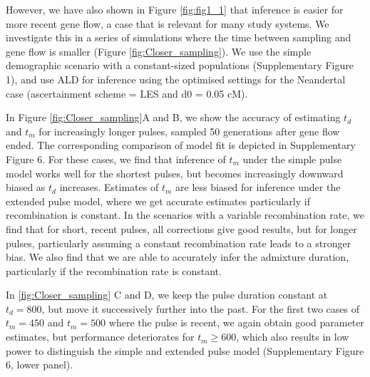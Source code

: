 \documentclass[11pt]{article}
\begin{document}
However, we have also shown in Figure  \ref{fig:fig1_1} that inference is easier for more recent gene flow, a case that is relevant for many study systems. We investigate this in a series of simulations where the time between sampling and gene flow is smaller (Figure \ref{fig:Closer_sampling}). We use the simple demographic scenario with a constant-sized populations (Supplementary Figure 1), and use ALD for inference using the optimised settings for the Neandertal case (ascertainment scheme = LES and  d0 = 0.05 cM).

In Figure \ref{fig:Closer_sampling}A and B, we show the accuracy of estimating $t_d$ and $t_m$ for increasingly longer pulses, sampled 50 generations after gene flow ended. The corresponding comparison of model fit is depicted in Supplementary Figure 6. For these cases, we find that inference of $t_m$ under the simple pulse model works well for the shortest pulses, but becomes increasingly downward biased as $t_d$ increases.  Estimates of $t_m$ are less biased for inference under the extended 
pulse model, where we get accurate estimates particularly if recombination is constant. In the scenarios with a variable recombination rate, we find that for short, recent pulses, all corrections give good results, but for longer pulses, particularly assuming a constant recombination rate leads to a stronger bias. We also find that we are able to accurately infer the admixture duration, particularly if the recombination rate is constant.

In \ref{fig:Closer_sampling} C and D, we keep the pulse duration constant at $t_d=800$, but move it successively further into the past. For the first two cases of $t_m=450$ and $t_m=500$ where the pulse is recent, we again obtain good parameter estimates, but performance deteriorates for $t_m \geq 600$, which also results in low power to distinguish the simple and extended pulse model (Supplementary Figure 6, lower panel). 
\end{document}

